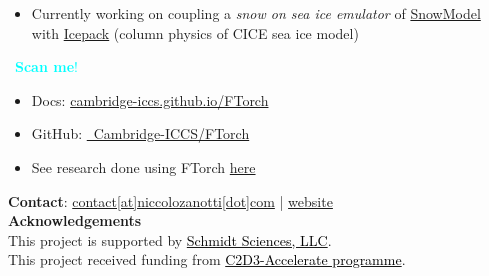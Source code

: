 \begin{itemize}
    \item Currently working on coupling a \emph{snow on sea ice emulator} of \href{https://doi.org/10.1175/JHM548.1}{SnowModel} with \href{https://github.com/CicE-Consortium/Icepack/}{Icepack} (column physics of CICE sea ice model)
\end{itemize}


   \hspace{0.7cm} \faCamera~\textcolor{cyan}{\textbf{Scan me}!}

  \begin{minipage}[t]{0.12\textwidth}
    \centering
  \end{minipage}
\begin{minipage}[t]{0.38\textwidth}
    \begin{itemize}
    \item Docs: \href{https://cambridge-iccs.github.io/FTorch/}{cambridge-iccs.github.io/FTorch}
    \item GitHub: \href{https://github.com/Cambridge-ICCS/FTorch}{\faGithub\ Cambridge-ICCS/FTorch}
    \item See research done using FTorch \href{https://github.com/cambridge-ICCS/FTorch/?tab=readme-ov-file#used-by}{here}
    \end{itemize}
  \end{minipage}

 \printbibliography
 
\textbf{Contact}:  \href{mailto:contact@niccolozanotti.com}{contact[at]niccolozanotti[dot]com} | \href{https://niccolozanotti.com}{website}\\
\textbf{Acknowledgements}\\
\small This project is supported by \href{https://www.schmidtsciences.org/}{\textcolor{black}{Schmidt Sciences, LLC}}. \\
\small This project received funding from \href{https://science.ai.cam.ac.uk/news/2024-12-09-exploring-novel-applications-of-ai-for-research-and-innovation-%E2%80%93-announcing-our-2024-funded-projects.html}{\textcolor{black}{C2D3-Accelerate programme}}.
\vspace{0.5cm}
